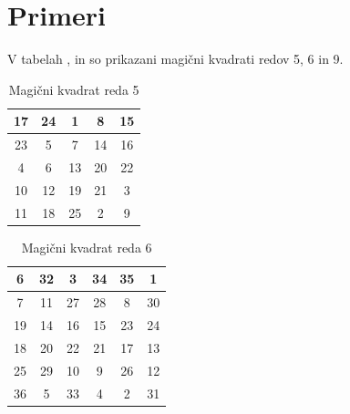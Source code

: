 \documentclass[a4paper,12pt]{article}
\theoremstyle{plain}
\theoremstyle{definition}
\theoremstyle{proof}
\begin{document}

\section{Primeri}

V tabelah \cite{ref}, \cite{ref} in \cite{ref} so prikazani
magični kvadrati redov 5, 6 in 9.


\begin{table} [htp]
   \caption{Magični kvadrat reda 5}
   \centering
   \large
   
\begin{tabular}{|c|c|c|c|c|}
\hline
17 & 24 &  1 &  8 & 15 \\\hline
23 &  5 &  7 & 14 & 16 \\\hline
 4 &  6 & 13 & 20 & 22 \\\hline
 10 & 12 & 19 & 21 &  3 \\\hline
 11 & 18 & 25 &  2 &  9 \\\hline
\end{tabular}
\label{table:mag5}
\end{table}


\begin{table} [htp]
   \caption{Magični kvadrat reda 6}
   \centering
   \large
   
\begin{tabular}{|c|c|c|c|c|c|}
\hline
6 & 32 &  3 & 34 & 35 &  1 \\\hline
   7 & 11 & 27 & 28 &  8 & 30 \\\hline
   19 & 14 & 16 & 15 & 23 & 24 \\\hline
   18 & 20 & 22 & 21 & 17 & 13 \\\hline
   25 & 29 & 10 &  9 & 26 & 12 \\\hline
   36 &  5 & 33 &  4 &  2 & 31 \\\hline
\end{tabular}
\label{table:mag6}
\end{table}
\end{document}
